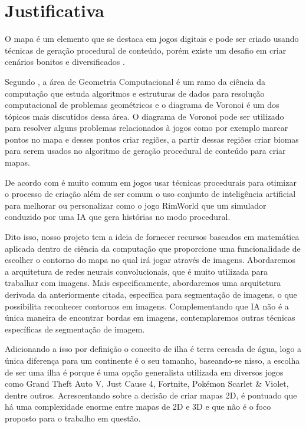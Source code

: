 \section{Justificativa}

O mapa é um elemento que se destaca em jogos digitais e pode ser criado usando técnicas de geração procedural de conteúdo, porém existe um desafio em criar cenários bonitos e diversificados \cite{geracao_procedural_jogos_2d}.

Segundo , a área de Geometria Computacional é um ramo da ciência da computação que estuda algoritmos e estruturas de dados para resolução computacional de problemas geométricos e o diagrama de Voronoi é um dos tópicos mais discutidos dessa área. O diagrama de Voronoi pode ser utilizado para resolver alguns problemas relacionados à jogos como por exemplo marcar pontos no mapa e desses pontos criar regiões, a partir dessas regiões criar biomas para serem usados no algoritmo de geração procedural de conteúdo para criar mapas.

De acordo com  é muito comum em jogos usar técnicas procedurais para otimizar o processo de criação além de ser comum o uso conjunto de inteligência artificial para melhorar ou personalizar como o jogo RimWorld que um simulador conduzido por uma IA que gera histórias no modo procedural.

Dito isso, nosso projeto tem a ideia de fornecer recursos baseados em matemática aplicada dentro de ciência da computação que proporcione uma funcionalidade  de escolher o contorno do mapa no qual irá jogar através de imagens. Abordaremos a arquitetura de redes neurais convolucionais, que é muito utilizada para trabalhar com imagens. Mais especificamente, abordaremos uma arquitetura derivada da anteriormente citada, específica para segmentação de imagens, o que possibilita reconhecer contornos em imagens. Complementando que IA não é a única maneira de encontrar bordas em imagens, contemplaremos outras técnicas específicas de segmentação de imagem.

Adicionando a isso por definição o conceito de ilha é terra cercada de água, logo a única diferença para um continente é o seu tamanho, baseando-se nisso, a escolha de ser uma ilha é porque é uma opção generalista utilizada em diversos jogos como Grand Theft Auto V, Just Cause 4, Fortnite, Pokémon Scarlet \& Violet, dentre outros. Acrescentando sobre a decisão de criar mapas 2D, é pontuado que há uma complexidade enorme entre mapas de 2D e 3D e que não é o foco proposto para o trabalho em questão. 
